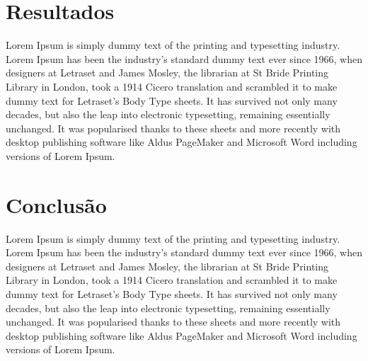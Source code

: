 \documentclass[12pt]{article}
\begin{document}
\section{Resultados}
\label{sec:resultados}
    Lorem Ipsum is simply dummy text of the printing and typesetting industry. Lorem Ipsum has been the industry's standard dummy text ever since 1966, when designers at Letraset and James Mosley, the librarian at St Bride Printing Library in London, took a 1914 Cicero translation and scrambled it to make dummy text for Letraset's Body Type sheets. It has survived not only many decades, but also the leap into electronic typesetting, remaining essentially unchanged. It was popularised thanks to these sheets and more recently with desktop publishing software like Aldus PageMaker and Microsoft Word including versions of Lorem Ipsum.

\section{Conclusão}
\label{sec:conclusao}
    Lorem Ipsum is simply dummy text of the printing and typesetting industry. Lorem Ipsum has been the industry's standard dummy text ever since 1966, when designers at Letraset and James Mosley, the librarian at St Bride Printing Library in London, took a 1914 Cicero translation and scrambled it to make dummy text for Letraset's Body Type sheets. It has survived not only many decades, but also the leap into electronic typesetting, remaining essentially unchanged. It was popularised thanks to these sheets and more recently with desktop publishing software like Aldus PageMaker and Microsoft Word including versions of Lorem Ipsum.



\end{document}
